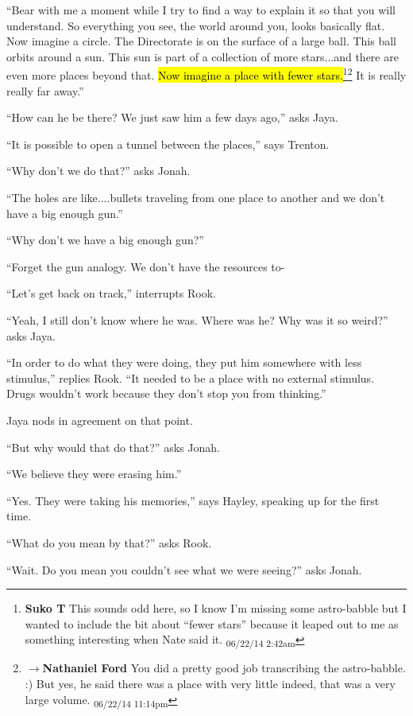 ``Bear with me a moment while I try to find a way to explain it so that you will understand.  So everything you see, the world around you, looks basically flat.  Now imagine a circle.  The Directorate is on the surface of a large ball.  This ball orbits around a sun.  This sun is part of a collection of more stars...and there are even more places beyond that.  \hl{Now imagine a place with fewer stars.}\footnote{\textbf{Suko T }This sounds odd here, so I know I'm missing some astro-babble but I wanted to include the bit about ``fewer stars'' because it leaped out to me as something interesting when Nate said it. \textsubscript{06/22/14 2:42am}}\footnote{$\rightarrow$\textbf{Nathaniel Ford }You did a pretty good job transcribing the astro-babble. :) But yes, he said there was a place with very little indeed, that was a very large volume. \textsubscript{06/22/14 11:14pm}}  It is really really far away.''

``How can he be there?  We just saw him a few days ago,'' asks Jaya.

``It is possible to open a tunnel between the places,'' says Trenton.

``Why don't we do that?'' asks Jonah.

``The holes are like....bullets traveling from one place to another and we don't have a big enough gun.''

``Why don't we have a big enough gun?''

``Forget the gun analogy.  We don't have the resources to-

``Let's get back on track,'' interrupts Rook.

``Yeah, I still don't know where he was. Where was he?  Why was it so weird?'' asks Jaya.

``In order to do what they were doing, they put him somewhere with less stimulus,'' replies Rook.  ``It needed to be a place with no external stimulus.  Drugs wouldn't work because they don't stop you from thinking.''

Jaya nods in agreement on that point.

``But why would that do that?'' asks Jonah.

``We believe they were erasing him.''

``Yes.  They were taking his memories,'' says Hayley, speaking up for the first time. 

``What do you mean by that?'' asks Rook.

``Wait.  Do you mean you couldn't see what we were seeing?'' asks Jonah.

